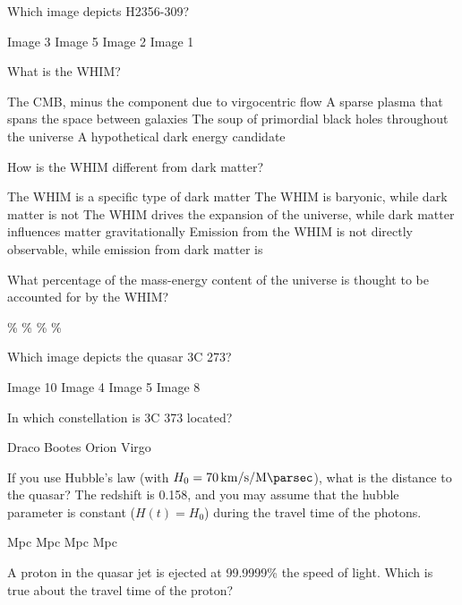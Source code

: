 \documentclass{exam}
\begin{document}
\begin{multicols*}{2}
\begin{questions}
\setcounter{question}{16}
\question Which image depicts H2356-309?
	\begin{choices}
	\CorrectChoice Image 3
	\choice Image 5
	\choice Image 2
	\choice Image 1
	\end{choices}
\question What is the WHIM?
	\begin{choices}
	\choice The CMB, minus the component due to virgocentric flow
	\CorrectChoice A sparse plasma that spans the space between galaxies
	\choice The soup of primordial black holes throughout the universe
	\choice A hypothetical dark energy candidate
	\end{choices}
\question How is the WHIM different from dark matter?
	\begin{choices}
	\choice The WHIM is a specific type of dark matter
	\CorrectChoice The WHIM is baryonic, while dark matter is not
	\choice The WHIM drives the expansion of the universe, while dark matter influences matter gravitationally
	\choice Emission from the WHIM is not directly observable, while emission from dark matter is
	\end{choices}
\question What percentage of the mass-energy content of the universe is thought to be accounted for by the WHIM?
	\begin{choices}
	\%
	\% 
	\%
	\%
	\end{choices}
\end{questions}
\vfill\null\columnbreak
\begin{questions}
\setcounter{question}{20}
\question Which image depicts the quasar 3C 273?
	\begin{choices}
	\choice Image 10
	\choice Image 4
	\choice Image 5
	\CorrectChoice Image 8
	\end{choices}
\question In which constellation is 3C 373 located?
	\begin{choices}
	\choice Draco
	\choice Bootes
	\choice Orion
	\CorrectChoice Virgo
	\end{choices}
\question If you use Hubble’s law (with $H_0=\SI{70}{\kilo\meter\per\second\per\mega\parsec}$), what is the distance to the quasar? The redshift is 0.158, and you may assume that the hubble parameter is constant ($H(t)=H_0$) during the travel time of the photons.
	\begin{choices}
	 Mpc 
	 Mpc
	 Mpc
	 Mpc
	\end{choices}
\question A proton in the quasar jet is ejected at 99.9999\% the speed of light. Which is true about the travel time of the proton?

\end{questions}
\end{multicols*}
\end{document}
